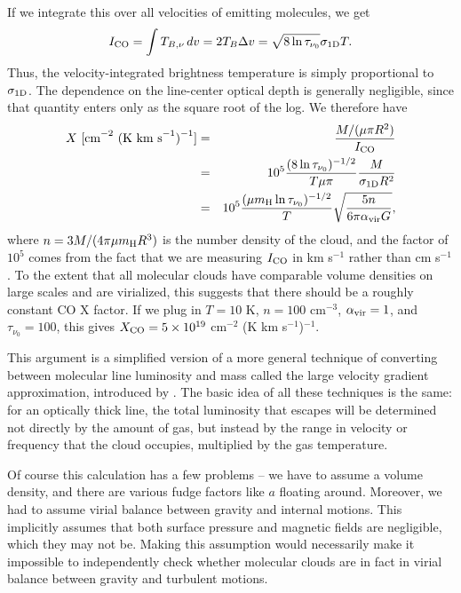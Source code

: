If we integrate this over all velocities of emitting molecules, we get
\begin{equation}
I_{\rm CO} = \int T_{B,\nu}\, dv = 2 T_B \Delta v = \sqrt{8\ln\tau_{\nu_0}} \sigma_{\rm 1D} T.
\end{equation}
Thus, the velocity-integrated brightness temperature is simply proportional to $\sigma_{\rm 1D}$. The dependence on the line-center optical depth is generally negligible, since that quantity enters only as the square root of the log. We therefore have
\begin{eqnarray*}
X\mbox{ [cm}^{-2}\mbox{ (K km s}^{-1}\mbox{)}^{-1}\mbox{]} & = & \frac{M/(\mu \pi R^2)}{I_{\rm CO}} \\
& = & 10^5 \frac{(8\ln\tau_{\nu_0})^{-1/2}}{T\mu\pi} \frac{M}{\sigma_{\rm 1D} R^2} \\
& = & 10^5 \frac{(\mu m_{\rm H} \ln\tau_{\nu_0})^{-1/2}}{T} \sqrt{\frac{5n}{6\pi \alpha_{\mathrm{vir}} G}},
\end{eqnarray*}
where $n= 3M/(4\pi \mu m_{\rm H} R^3)$ is the number density of the cloud, and the factor of $10^5$ comes from the fact that we are measuring $I_{\rm CO}$ in km s$^{-1}$ rather than cm s$^{-1}$. To the extent that all molecular clouds have comparable volume densities on large scales and are virialized, this suggests that there should be a roughly constant CO X factor. If we plug in $T=10$ K, $n=100$ cm$^{-3}$, $\alpha_{\mathrm{vir}}=1$, and $\tau_{\nu_0}=100$, this gives $X_{\rm CO}=5\times 10^{19}$ cm$^{-2}$ (K km s$^{-1}$)$^{-1}$.

This argument is a simplified version of a more general technique of converting between molecular line luminosity and mass called the large velocity gradient approximation, introduced by \citet{goldreich74a}. The basic idea of all these techniques is the same: for an optically thick line, the total luminosity that escapes will be determined not directly by the amount of gas, but instead by the range in velocity or frequency that the cloud occupies, multiplied by the gas temperature.

Of course this calculation has a few problems -- we have to assume a volume density, and there are various fudge factors like $a$ floating around. Moreover, we had to assume virial balance between gravity and internal motions. This implicitly assumes that both surface pressure and magnetic fields are negligible, which they may not be. Making this assumption would necessarily make it impossible to independently check whether molecular clouds are in fact in virial balance between gravity and turbulent motions.

